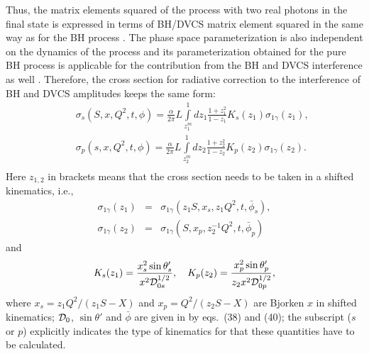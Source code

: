 \documentclass[aps,prd,reprint,groupedaddress,preprintnumbers,showpacs]{revtex4-1}
\begin{document}
Thus, the matrix elements squared of the process with two real photons in the final state is expressed in terms of BH/DVCS matrix element squared in  the same way as for the BH process \cite{AkushevichIlyichev2012}. The phase space parameterization is also independent on the dynamics of the process and its parameterization obtained for the pure BH process is applicable for the contribution from the BH and DVCS interference as well \cite{AkushevichIlyichev2012}. Therefore, the cross section for radiative correction to the interference of BH and DVCS amplitudes keeps the same 
form:
\begin{eqnarray}\label{iniint}
&&\sigma _{s}(S,x,Q^2,t,\phi)=\frac{\alpha}{2\pi }L
\int\limits_{z_{1}^m}^1 dz_1\frac {1+z_1^2}{1-z_1} 
K_s(z_1)\sigma _{1\gamma}(z_1),
\nonumber\\&&
\sigma _{p}(s,x,Q^2,t,\phi)=\frac{\alpha}{2\pi }L
\int\limits_{z_{2}^m}^1 dz_2\frac {1+z_2^2}{1-z_2}
K_p(z_2)\sigma _{1\gamma}(z_2).
\nonumber\\&&
\end{eqnarray}
Here $z_{1,2}$ in brackets means that the cross section needs to be taken in a shifted kinematics, i.e., 
\begin{eqnarray}
\sigma _{1\gamma}(z_1)&=&\sigma _{1\gamma}(z_1S,x_s,z_1Q^2,t,{\bar\phi}_s), \nonumber
\\
\sigma _{1\gamma}(z_2)&=&\sigma _{1\gamma}(S,x_p,z_2^{-1}Q^2,t,{\bar\phi}_p)
\label{sz1z2}
\end{eqnarray}
and 
\begin{equation}
K_s(z_1)={x_s^2\sin\theta_s '   \over x^2{{\cal D}_{0s}^{1/2}} },
\quad
 K_p(z_2)={x_p^2\sin\theta_p '  \over z_2x^2{{\cal D}_{0p}^{1/2}}},
\end{equation}
where $x_s=z_1Q^2/(z_1S-X)$ and $x_p=Q^2/(z_2S-X)$ are Bjorken $x$ in shifted kinematics;
${\cal D}_{0}$, $\sin\theta '$ and $\bar\phi$ are given in \cite{AkushevichIlyichev2012} by eqs.~(38) and (40);
the subscript ($s$ or $p$) explicitly indicates the type of kinematics for that these quantities have to be calculated.
\end{document}
